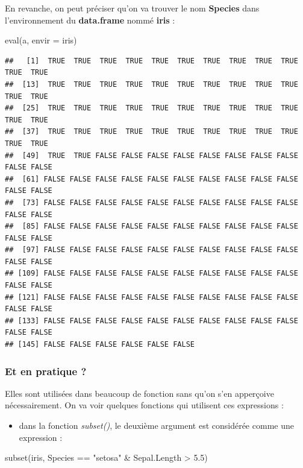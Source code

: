 \documentclass[
]{book}
\newenvironment{Shaded}{\begin{snugshade}}{\end{snugshade}}
\newcommand{\AttributeTok}[1]{\textcolor[rgb]{0.77,0.63,0.00}{#1}}
\newcommand{\FloatTok}[1]{\textcolor[rgb]{0.00,0.00,0.81}{#1}}
\newcommand{\FunctionTok}[1]{\textcolor[rgb]{0.00,0.00,0.00}{#1}}
\newcommand{\NormalTok}[1]{#1}
\newcommand{\SpecialCharTok}[1]{\textcolor[rgb]{0.00,0.00,0.00}{#1}}
\newcommand{\StringTok}[1]{\textcolor[rgb]{0.31,0.60,0.02}{#1}}
\providecommand{\tightlist}{%
  \setlength{\itemsep}{0pt}\setlength{\parskip}{0pt}}
\theoremstyle{definition}
\theoremstyle{definition}
\theoremstyle{definition}
\theoremstyle{definition}
\theoremstyle{remark}
\begin{document}
En revanche, on peut préciser qu'on va trouver le nom \textbf{Species} dans l'environnement du \textbf{data.frame} nommé \textbf{iris} :

\begin{Shaded}
\begin{Highlighting}[]
\FunctionTok{eval}\NormalTok{(a, }\AttributeTok{envir =}\NormalTok{ iris)}
\end{Highlighting}
\end{Shaded}

\begin{verbatim}
##   [1]  TRUE  TRUE  TRUE  TRUE  TRUE  TRUE  TRUE  TRUE  TRUE  TRUE  TRUE  TRUE
##  [13]  TRUE  TRUE  TRUE  TRUE  TRUE  TRUE  TRUE  TRUE  TRUE  TRUE  TRUE  TRUE
##  [25]  TRUE  TRUE  TRUE  TRUE  TRUE  TRUE  TRUE  TRUE  TRUE  TRUE  TRUE  TRUE
##  [37]  TRUE  TRUE  TRUE  TRUE  TRUE  TRUE  TRUE  TRUE  TRUE  TRUE  TRUE  TRUE
##  [49]  TRUE  TRUE FALSE FALSE FALSE FALSE FALSE FALSE FALSE FALSE FALSE FALSE
##  [61] FALSE FALSE FALSE FALSE FALSE FALSE FALSE FALSE FALSE FALSE FALSE FALSE
##  [73] FALSE FALSE FALSE FALSE FALSE FALSE FALSE FALSE FALSE FALSE FALSE FALSE
##  [85] FALSE FALSE FALSE FALSE FALSE FALSE FALSE FALSE FALSE FALSE FALSE FALSE
##  [97] FALSE FALSE FALSE FALSE FALSE FALSE FALSE FALSE FALSE FALSE FALSE FALSE
## [109] FALSE FALSE FALSE FALSE FALSE FALSE FALSE FALSE FALSE FALSE FALSE FALSE
## [121] FALSE FALSE FALSE FALSE FALSE FALSE FALSE FALSE FALSE FALSE FALSE FALSE
## [133] FALSE FALSE FALSE FALSE FALSE FALSE FALSE FALSE FALSE FALSE FALSE FALSE
## [145] FALSE FALSE FALSE FALSE FALSE FALSE
\end{verbatim}

\hypertarget{et-en-pratique}{%
\subsubsection{Et en pratique ?}\label{et-en-pratique}}

Elles sont utilisées dans beaucoup de fonction sans qu'on s'en apperçoive nécessairement. On va voir quelques fonctions qui utilisent ces expressions :

\begin{itemize}
\tightlist
\item
  dans la fonction \emph{subset()}, le deuxième argument est considérée comme une expression :
\end{itemize}

\begin{Shaded}
\begin{Highlighting}[]
\FunctionTok{subset}\NormalTok{(iris, Species }\SpecialCharTok{==} \StringTok{"setosa"} \SpecialCharTok{\&}\NormalTok{ Sepal.Length }\SpecialCharTok{\textgreater{}} \FloatTok{5.5}\NormalTok{)}
\end{Highlighting}
\end{Shaded}
\end{document}
